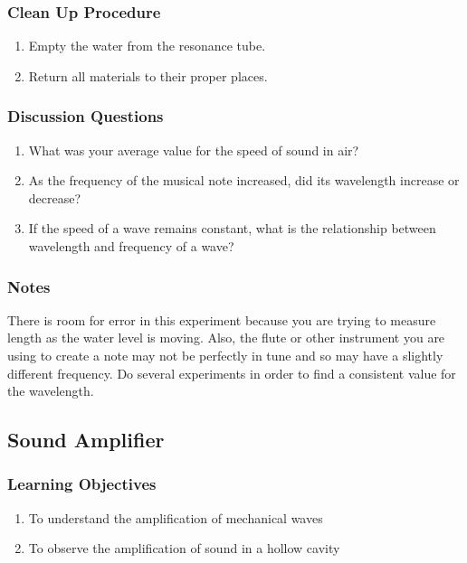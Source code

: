 \subsubsection*{Clean Up Procedure}
\begin{enumerate}
\item{Empty the water from the resonance tube.} 
\item{Return all materials to their proper places.} 
\end{enumerate}

\subsubsection*{Discussion Questions}
\begin{enumerate}
\item{What was your average value for the speed of sound in air?}
\item{As the frequency of the musical note increased, did its wavelength increase or decrease?}
\item{If the speed of a wave remains constant, what is the relationship between wavelength and frequency of a wave?}
\end{enumerate}

\subsubsection*{Notes}
There is room for error in this experiment because you are trying to measure length as the water level is moving. Also, the flute or other instrument you are using to create a note may not be perfectly in tune and so may have a slightly different frequency. Do several experiments in order to find a consistent value for the wavelength.


\subsection{Sound Amplifier}

\subsubsection*{Learning Objectives}
\begin{enumerate}
\item{To understand the amplification of mechanical waves}
\item{To observe the amplification of sound in a hollow cavity}
\end{enumerate}

